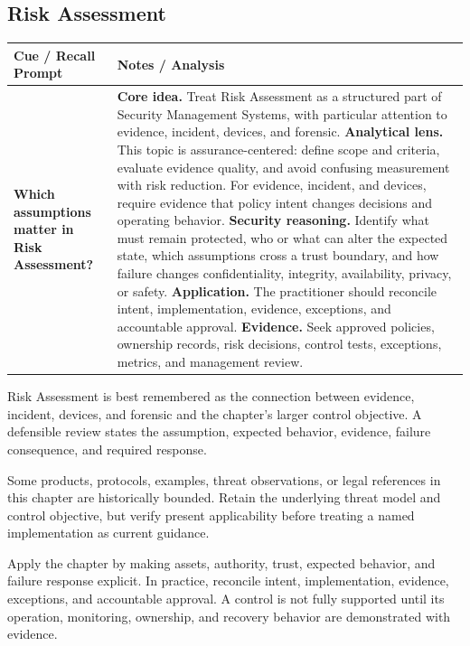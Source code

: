\documentclass[11pt]{article}
\newcommand{\CornellHeader}{%
\rowcolor{Navy}\color{white}\bfseries Cue / Recall Prompt & \color{white}\bfseries Notes / Analysis\\\hline}
\newcommand{\CornellRow}[2]{%
\cellcolor{CueGray}\RaggedRight\textbf{#1} & \RaggedRight #2\\\hline}
\begin{document}
\subsection*{Risk Assessment}
\begin{longtable}{>{\RaggedRight\arraybackslash}p{}|>{\RaggedRight\arraybackslash}p{}}
\CornellHeader
\CornellRow{Which assumptions matter in Risk Assessment?}{\textbf{Core idea.} Treat Risk Assessment as a structured part of Security Management Systems, with particular attention to evidence, incident, devices, and forensic. \textbf{Analytical lens.} This topic is assurance-centered: define scope and criteria, evaluate evidence quality, and avoid confusing measurement with risk reduction. For evidence, incident, and devices, require evidence that policy intent changes decisions and operating behavior. \textbf{Security reasoning.} Identify what must remain protected, who or what can alter the expected state, which assumptions cross a trust boundary, and how failure changes confidentiality, integrity, availability, privacy, or safety. \textbf{Application.} The practitioner should reconcile intent, implementation, evidence, exceptions, and accountable approval. \textbf{Evidence.} Seek approved policies, ownership records, risk decisions, control tests, exceptions, metrics, and management review.}
\end{longtable}
\begin{topicsummary}
Risk Assessment is best remembered as the connection between evidence, incident, devices, and forensic and the chapter's larger control objective. A defensible review states the assumption, expected behavior, evidence, failure consequence, and required response.
\end{topicsummary}
\begin{historybox}
Some products, protocols, examples, threat observations, or legal references in this chapter are historically bounded. Retain the underlying threat model and control objective, but verify present applicability before treating a named implementation as current guidance.
\end{historybox}
\begin{defensebox}
Apply the chapter by making assets, authority, trust, expected behavior, and failure response explicit. In practice, reconcile intent, implementation, evidence, exceptions, and accountable approval. A control is not fully supported until its operation, monitoring, ownership, and recovery behavior are demonstrated with evidence.
\end{defensebox}
\end{document}
